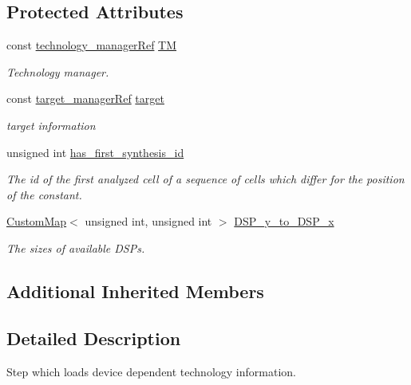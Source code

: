 \subsection*{Protected Attributes}
\begin{DoxyCompactItemize}
\item 
const \hyperlink{technology__manager_8hpp_a4b9ecd440c804109c962654f9227244e}{technology\+\_\+manager\+Ref} \hyperlink{classFunctionalUnitStep_a401c44f077057f9b3bf56141cf8aa6fc}{TM}
\begin{DoxyCompactList}\small\item\em Technology manager. \end{DoxyCompactList}\item 
const \hyperlink{target__manager_8hpp_aee0b586a84fb6eb4faefa6e41e1735a9}{target\+\_\+manager\+Ref} \hyperlink{classFunctionalUnitStep_a1f90bc8bd6531c4cdf67966734a66cea}{target}
\begin{DoxyCompactList}\small\item\em target information \end{DoxyCompactList}\item 
unsigned int \hyperlink{classFunctionalUnitStep_a50f97ea76cd8c763ae8c42472ea40287}{has\+\_\+first\+\_\+synthesis\+\_\+id}
\begin{DoxyCompactList}\small\item\em The id of the first analyzed cell of a sequence of cells which differ for the position of the constant. \end{DoxyCompactList}\item 
\hyperlink{custom__map_8hpp_a18ca01763abbe3e5623223bfe5aaac6b}{Custom\+Map}$<$ unsigned int, unsigned int $>$ \hyperlink{classFunctionalUnitStep_a56a8b3273efc8b8aa42f6bb6b7d86619}{D\+S\+P\+\_\+y\+\_\+to\+\_\+\+D\+S\+P\+\_\+x}
\begin{DoxyCompactList}\small\item\em The sizes of available D\+S\+Ps. \end{DoxyCompactList}\end{DoxyCompactItemize}
\subsection*{Additional Inherited Members}


\subsection{Detailed Description}
Step which loads device dependent technology information. 

